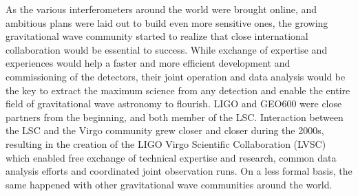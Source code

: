 As the various interferometers around the world were brought online, and ambitious plans were laid out to build even more sensitive ones, the growing gravitational wave community started to realize that close international collaboration would be essential to success.
While exchange of expertise and experiences would help a faster and more efficient development and commissioning of the detectors, their joint operation and data analysis would be the key to extract the maximum science from any detection and enable the entire field of gravitational wave astronomy to flourish.
LIGO and GEO600 were close partners from the beginning, and both member of the LSC. Interaction between the LSC and the Virgo community grew closer and closer during the 2000s, resulting in the creation of the LIGO Virgo Scientific Collaboration (LVSC) which enabled free exchange of technical expertise and research, common data analysis efforts and coordinated joint observation runs.
On a less formal basis, the same happened with other gravitational wave communities around the world.